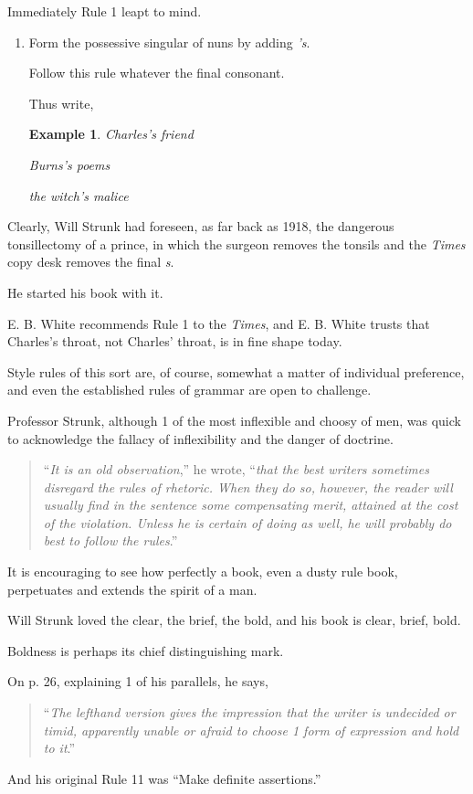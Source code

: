 \documentclass{article}
\newtheorem{example}{Example}
\begin{document}
Immediately Rule 1 leapt to mind.
\begin{enumerate}
	\item Form the possessive singular of nuns by adding {\it 's}.
	
	Follow this rule whatever the final consonant.
	
	Thus write,
	\begin{example}
		Charles's friend
		
		Burns's poems
		
		the witch's malice
	\end{example}
\end{enumerate}
Clearly, Will Strunk had foreseen, as far back as 1918, the dangerous tonsillectomy of a prince, in which the surgeon removes the tonsils and the {\it Times} copy desk removes the final {\it s}.

He started his book with it.

E. B. White recommends Rule 1 to the {\it Times}, and E. B. White trusts that Charles's throat, not Charles' throat, is in fine shape today.

%
Style rules of this sort are, of course, somewhat a matter of individual preference, and even the established rules of grammar are open to challenge.

Professor Strunk, although 1 of the most inflexible and choosy of men, was quick to acknowledge the fallacy of inflexibility and the danger of doctrine.
\begin{quotation}
	``{\it It is an old observation},'' he wrote, ``{\it that the best writers sometimes disregard the rules of rhetoric. When they do so, however, the reader will usually find in the sentence some compensating merit, attained at the cost of the violation. Unless he is certain of doing as well, he will probably do best to follow the rules}.''
\end{quotation}
It is encouraging to see how perfectly a book, even a dusty rule book, perpetuates and extends the spirit of a man.

Will Strunk loved the clear, the brief, the bold, and his book is clear, brief, bold.

Boldness is perhaps its chief distinguishing mark.

On p. 26, explaining 1 of his parallels, he says,
\begin{quotation}
	``{\it The lefthand version gives the impression that the writer is undecided or timid, apparently unable or afraid to choose 1 form of expression and hold to it}.''
\end{quotation}
And his original Rule 11 was ``Make definite assertions.''
\end{document}
